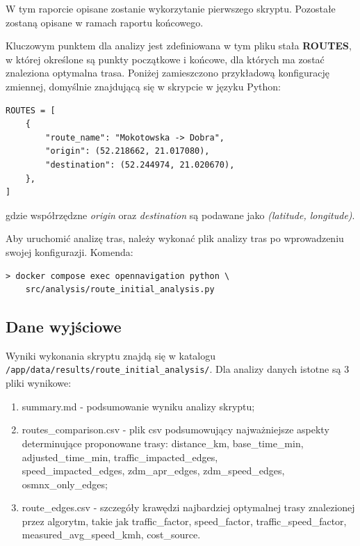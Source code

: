 \documentclass[12pt]{article}
\begin{document}
W tym raporcie opisane zostanie wykorzytanie pierwszego skryptu. Pozostałe zostaną opisane w ramach raportu końcowego.

Kluczowym punktem dla analizy jest zdefiniowana w tym pliku stała \textbf{ROUTES}, w której określone są punkty 
początkowe i końcowe, dla których ma zostać znaleziona optymalna trasa.
Poniżej zamieszczono przykładową konfigurację zmiennej, domyślnie znajdującą się w skrypcie w języku Python:

\begin{tcolorbox}
    \begin{verbatim}
ROUTES = [
    {
        "route_name": "Mokotowska -> Dobra",
        "origin": (52.218662, 21.017080),
        "destination": (52.244974, 21.020670),
    },
]
    \end{verbatim}
\end{tcolorbox} 
gdzie współrzędzne \textit{origin} oraz \textit{destination} są podawane jako \textit{(latitude, longitude)}.

Aby uruchomić analizę tras, należy wykonać plik analizy tras po wprowadzeniu swojej konfigurazji. Komenda:
\begin{tcolorbox}
    \begin{verbatim}
> docker compose exec opennavigation python \
    src/analysis/route_initial_analysis.py
    \end{verbatim}
\end{tcolorbox} 


\subsection{Dane wyjściowe}
Wyniki wykonania skryptu znajdą się w katalogu \verb|/app/data/results/route_initial_analysis/|. Dla analizy danych 
istotne są 3 pliki wynikowe:
\begin{enumerate}
    \item summary.md - podsumowanie wyniku analizy skryptu;
    \item routes\_comparison.csv - plik csv podsumowujący najważniejsze aspekty determinujące proponowane trasy:
    distance\_km, base\_time\_min, adjusted\_time\_min, traffic\_impacted\_edges, \\
    speed\_impacted\_edges, zdm\_apr\_edges, zdm\_speed\_edges, osmnx\_only\_edges; 
    \item route\_edges.csv - szczegóły krawędzi najbardziej optymalnej trasy znalezionej przez algorytm, takie jak 
            traffic\_factor, speed\_factor, traffic\_speed\_factor, measured\_avg\_speed\_kmh, cost\_source.
\end{enumerate}
\end{document}
